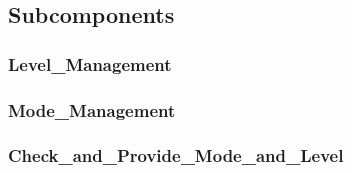 \subsection{Subcomponents}\label{s:mdoe_and_level_subcomponents}

\subsubsection{Level\_Management}


\subsubsection{Mode\_Management}


\subsubsection{Check\_and\_Provide\_Mode\_and\_Level}



